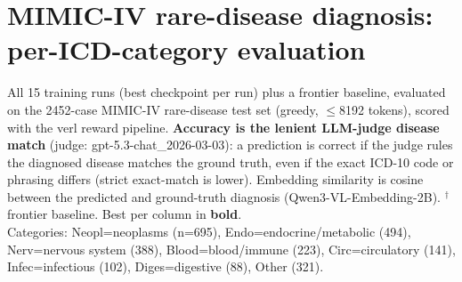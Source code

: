 \documentclass[10pt]{article}
\begin{document}
\section*{MIMIC-IV rare-disease diagnosis: per-ICD-category evaluation}
All 15 training runs (best checkpoint per run) plus a frontier baseline, evaluated on the 2452-case MIMIC-IV rare-disease test set (greedy, $\le$8192 tokens), scored with the verl reward pipeline. \textbf{Accuracy is the lenient LLM-judge disease match} (judge: gpt-5.3-chat\_2026-03-03): a prediction is correct if the judge rules the diagnosed disease matches the ground truth, even if the exact ICD-10 code or phrasing differs (strict exact-match is lower). Embedding similarity is cosine between the predicted and ground-truth diagnosis (Qwen3-VL-Embedding-2B). $^\dagger$ frontier baseline. Best per column in \textbf{bold}.
\\[4pt]
\footnotesize Categories: Neopl=neoplasms (n=695), Endo=endocrine/metabolic (494), Nerv=nervous system (388), Blood=blood/immune (223), Circ=circulatory (141), Infec=infectious (102), Diges=digestive (88), Other (321).
\normalsize
\end{document}
